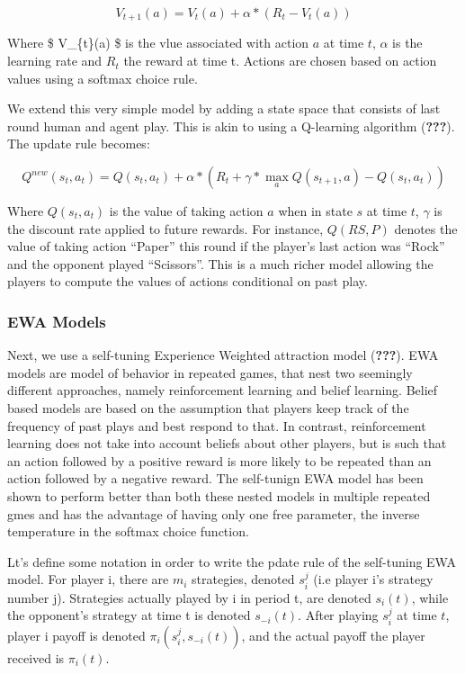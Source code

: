\documentclass[man,floatsintext]{apa6}
\begin{document}
\[ V_{t+1}(a) = V_{t}(a) + \alpha*( R_{t}  - V_{t}(a)) \]

Where \$ V\_\{t\}(a) \$ is the vlue associated with action \(a\) at time \(t\), \(\alpha\) is the learning rate and \(R_{t}\) the reward at time t. Actions are chosen based on action values using a softmax choice rule.

We extend this very simple model by adding a state space that consists of last round human and agent play. This is akin to using a Q-learning algorithm ({\textbf{???}}). The update rule becomes:

\[ Q^{new}(s_{t},a_{t}) = Q(s_{t},a_{t}) + \alpha*( R_{t}  + \gamma*\underset{a}{\max}Q(s_{t+1},a) - Q(s_{t},a_{t}) ) \]

Where \(Q(s_{t},a_{t})\) is the value of taking action \(a\) when in state \(s\) at time \(t\), \(\gamma\) is the discount rate applied to future rewards. For instance, \(Q(RS,P)\) denotes the value of taking action ``Paper'' this round if the player's last action was ``Rock'' and the opponent played ``Scissors''. This is a much richer model allowing the players to compute the values of actions conditional on past play.

\hypertarget{ewa-models}{%
\subsubsection{EWA Models}\label{ewa-models}}

Next, we use a self-tuning Experience Weighted attraction model ({\textbf{???}}). EWA models are model of behavior in repeated games, that nest two seemingly different approaches, namely reinforcement learning and belief learning. Belief based models are based on the assumption that players keep track of the frequency of past plays and best respond to that. In contrast, reinforcement learning does not take into account beliefs about other players, but is such that an action followed by a positive reward is more likely to be repeated than an action followed by a negative reward. The self-tunign EWA model has been shown to perform better than both these nested models in multiple repeated gmes and has the advantage of having only one free parameter, the inverse temperature in the softmax choice function.

Lt's define some notation in order to write the pdate rule of the self-tuning EWA model. For player i, there are \(m_{i}\) strategies, denoted \(s_{i}^{j}\) (i.e player i's strategy number j). Strategies actually played by i in period t, are denoted \(s_{i}(t)\), while the opponent's strategy at time t is denoted \(s_{-i}(t)\). After playing \(s_{i}^{j}\) at time \(t\), player i payoff is denoted \(\pi_{i}(s_{i}^{j},s_{-i}(t))\), and the actual payoff the player received is \(\pi_{i}(t)\).
\end{document}
